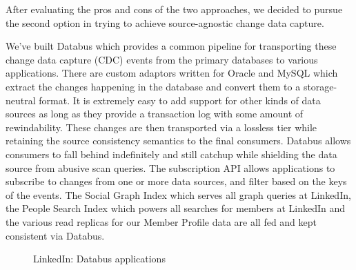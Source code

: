 After evaluating the pros and cons of the two approaches, we decided to pursue the second option in trying to achieve source-agnostic change data capture. 

  
We've built Databus which provides a common pipeline for transporting these change data capture (CDC) events from the primary databases to various applications. 
There are custom adaptors written for Oracle and MySQL which extract the changes happening in the database and convert them to a storage-neutral format. 
It is extremely easy to add support for other kinds of data sources as long as they provide a transaction log with some amount of rewindability.
These changes are then transported via a lossless tier while retaining the source consistency semantics to the final consumers. 
Databus allows consumers to fall behind indefinitely and still catchup while shielding the data source from abusive scan queries. 
The subscription API allows applications to subscribe to changes from one or more data sources, and filter based on the keys of the events.  
The Social Graph Index which serves all graph queries at LinkedIn, the People Search Index which powers all searches for members at LinkedIn and the various read replicas for our Member Profile data are all fed and kept consistent via Databus. 
\begin{figure}
\centering
{}
\caption{LinkedIn: Databus applications}
\label{fig:databus-use-cases}
\end{figure}






